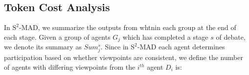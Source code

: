 \subsection{Token Cost Analysis} \label{token-consumption-analysis}




In \({\text{S}^2\text{-MAD}}\), we summarize the outputs from whtnin each group at the end of each stage. 
Given a group of agents $G_j$ which has completed a stage $s$ of debate, we denote its summary as $Sum_j^s$.
Since in \({\text{S}^2\text{-MAD}}\)  each agent determines participation based on whether viewpoints are consistent, we define the number of agents with differing viewpoints from the $i^{th}$ agent $D_i$ is:


